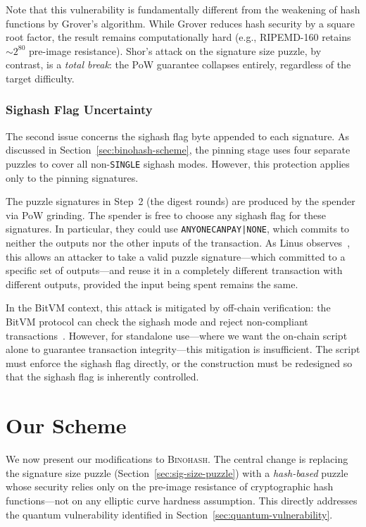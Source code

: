 \documentclass[11pt, a4paper]{article}
\begin{document}
Note that this vulnerability is fundamentally different from the weakening of hash functions by Grover's algorithm. While Grover reduces hash security by a square root factor, the result remains computationally hard (e.g., RIPEMD-160 retains~${\sim}2^{80}$ pre-image resistance). Shor's attack on the signature size puzzle, by contrast, is a \emph{total break}: the PoW guarantee collapses entirely, regardless of the target difficulty.

\subsubsection{Sighash Flag Uncertainty}
\label{sec:sighash-vulnerability}

The second issue concerns the sighash flag byte appended to each signature. As discussed in Section~\ref{sec:binohash-scheme}, the pinning stage uses four separate puzzles to cover all non-\texttt{SINGLE} sighash modes. However, this protection applies only to the pinning signatures.

The puzzle signatures in Step~2 (the digest rounds) are produced by the spender via PoW grinding. The spender is free to choose any sighash flag for these signatures. In particular, they could use \texttt{ANYONECANPAY|NONE}, which commits to neither the outputs nor the other inputs of the transaction. As Linus observes~\cite[Section~7.1]{linus2024binohash}, this allows an attacker to take a valid puzzle signature---which committed to a specific set of outputs---and reuse it in a completely different transaction with different outputs, provided the input being spent remains the same.

In the BitVM context, this attack is mitigated by off-chain verification: the BitVM protocol can check the sighash mode and reject non-compliant transactions~\cite[Section~7.1]{linus2024binohash}. However, for standalone use---where we want the on-chain script alone to guarantee transaction integrity---this mitigation is insufficient. The script must enforce the sighash flag directly, or the construction must be redesigned so that the sighash flag is inherently controlled.

\section{Our Scheme}
\label{sec:scheme}

We now present our modifications to \textsc{Binohash}. The central change is replacing the signature size puzzle (Section~\ref{sec:sig-size-puzzle}) with a \emph{hash-based} puzzle whose security relies only on the pre-image resistance of cryptographic hash functions---not on any elliptic curve hardness assumption. This directly addresses the quantum vulnerability identified in Section~\ref{sec:quantum-vulnerability}.
\end{document}
